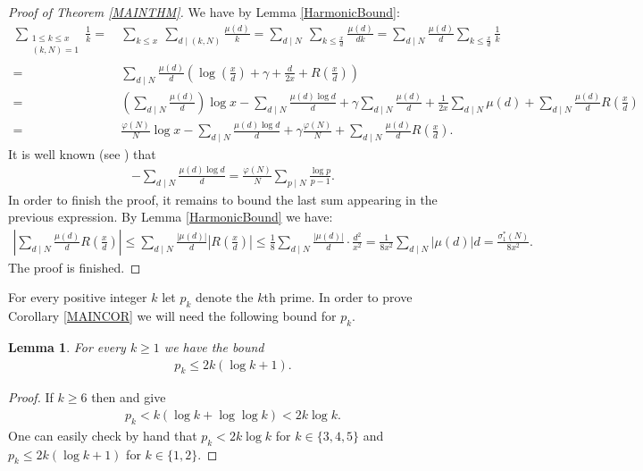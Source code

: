 \documentclass[a4paper]{amsart}
\newtheorem{lem}{Lemma}
\newcommand{\1}{\mathbbm{1}}
\begin{document}
\begin{proof}[Proof of Theorem \ref{MAINTHM}]
We have by Lemma \ref{HarmonicBound}:
\begin{align*}
\sum_{\substack{1\leq k\leq x \\ (k,N)=1}} \frac{1}{k} = &\ \sum_{k\leq x}\ \sum_{d\mid (k,N)}\frac{\mu(d)}{k} = \sum_{d\mid N}\ \sum_{k\leq \frac{x}{d}}\frac{\mu(d)}{dk}=\sum_{d\mid N}\frac{\mu(d)}{d}\sum_{k\leq \frac{x}{d}}\frac{1}{k} \\
= &\ \sum_{d\mid N}\frac{\mu(d)}{d}\left(\log\left(\frac{x}{d}\right) +\gamma +\frac{d}{2x} +R\left(\frac{x}{d}\right)\right) \\
= &\ \left(\sum_{d\mid N}\frac{\mu (d)}{d}\right)\log x - \sum_{d\mid N}\frac{\mu (d)\log d}{d} + \gamma \sum_{d\mid N}\frac{\mu (d)}{d} +\frac{1}{2x}\sum_{d\mid N}\mu (d) + \sum_{d\mid N}\frac{\mu (d)}{d}R\left(\frac{x}{d}\right) \\
= &\ \frac{\varphi (N)}{N}\log x - \sum_{d\mid N}\frac{\mu (d)\log d}{d} +\gamma\frac{\varphi (N)}{N} + \sum_{d\mid N}\frac{\mu (d)}{d}R\left(\frac{x}{d}\right).
\end{align*}
It is well known (see \cite[2.1.1 Exercise 16(a)]{MV}) that
\begin{align*}
-\sum_{d\mid N}\frac{\mu (d)\log d}{d} = \frac{\varphi (N)}{N}\sum_{p\mid N}\frac{\log p}{p-1}.
\end{align*}
In order to finish the proof, it remains to bound the last sum appearing in the previous expression. By Lemma \ref{HarmonicBound} we have:
\begin{align*}
\left|\sum_{d\mid N}\frac{\mu (d)}{d}R\left(\frac{x}{d}\right)\right| \leq \sum_{d\mid N}\frac{|\mu (d)|}{d}\left|R\left(\frac{x}{d}\right)\right| \leq \frac{1}{8}\sum_{d\mid N}\frac{|\mu (d)|}{d} \cdot \frac{d^{2}}{x^{2}}=\frac{1}{8x^{2}}\sum_{d\mid N}|\mu (d)|d = \frac{\sigma_{1}^{*}(N)}{8x^{2}}.
\end{align*}
The proof is finished.
\end{proof}


For every positive integer $k$ let $p_{k}$ denote the $k$th prime. In order to prove Corollary \ref{MAINCOR} we will need the following bound for $p_{k}$.

\begin{lem}\label{PrimeBound}
For every $k\geq 1$ we have the bound
\begin{align*}
p_{k}\leq 2k(\log k+1).
\end{align*}
\end{lem}
\begin{proof}
If $k\geq 6$ then \cite[Theorems 28 and 30B]{Rosser} and \cite[Section 4]{Dusart} give
\begin{align*}
p_{k}<k(\log k+\log\log k)<2k\log k.
\end{align*}
One can easily check by hand that $p_{k}<2k\log k$ for $k\in\{3,4,5\}$ and $p_{k}\leq 2k(\log k+1)$ for $k\in\{1,2\}$.
\end{proof}
\end{document}
